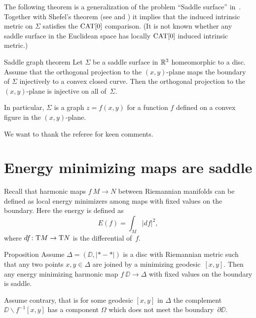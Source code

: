 \documentclass{article}
\begin{document}
The following theorem is a generalization of the problem ``Saddle surface'' in~\cite{petrunin-orthodox}.
Together with Shefel's theorem (see \cite{shefel-3D} and \cite[4.5.5]{akp}) it implies that the induced 
intrinsic metric on $\Sigma$ satisfies the $\mathop{\rm CAT}\nolimits[0]$ comparison. 
(It is not known whether any saddle surface in the Euclidean space has locally $\mathop{\rm CAT}\nolimits[0]$ induced intrinsic metric.)

\begin{thm}{Saddle graph theorem}\label{cor:projection}
Let $\Sigma$ be a saddle surface in $\mathbb{R}^3$ homeomorphic to a disc.
Assume that the orthogonal projection to the $(x,y)$-plane
maps the boundary of $\Sigma$
injectively to a convex closed curve.
Then the orthogonal projection to the $(x,y)$-plane is injective on all of~$\Sigma$.

In particular, $\Sigma$ is a graph $z=f(x,y)$ for a function $f$ defined on a convex figure in the $(x,y)$-plane.
\end{thm}

\medskip

We want to thank the referee for keen comments.

\section{Energy minimizing maps are saddle}

Recall that harmonic maps $f\:M\to N$ between Riemannian manifolds can be defined as local energy minimizers 
among maps with fixed values on the boundary.
Here the energy is defined as 
\[E(f)=\int_M|df|^2,\]
where $df\colon\mathrm{T} M\to \mathrm{T} N$ is the differential of~$f$.

\begin{thm}{Proposition} 
Assume $\Delta=(\DD,|{*}-{*}|)$ is a disc with Riemannian metric such that any two points $x,y\in\Delta$ are joined by a minimizing geodesic~$[x,y]$.
Then any energy minimizing harmonic map $f\:\DD\to\Delta$ with fixed values on the boundary is saddle.
\end{thm}

Assume contrary, that is for some geodesic $[x,y]$ in $\Delta$ the complement $\DD\backslash f^{-1}[x,y]$ has a component 
$\Omega$ which does not meet the boundary~$\partial\DD$.
\end{document}
